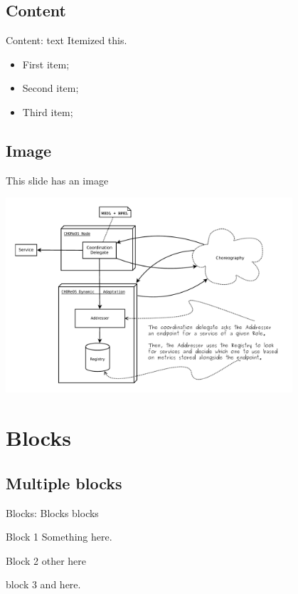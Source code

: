 \documentclass[slidestop,c]{beamer}
\begin{document}
\subsection{Content}
\begin{frame}[c]{Content: text}
    \justifying
      Itemized this. \\
     \begin{itemize}
      \item First item;
      \item Second item;
      \item Third item;
     \end{itemize}
\end{frame}

\subsection{Image}
\begin{frame}[c]{This slide has an image}
\begin{center}
      \includegraphics[width=0.8\textwidth]{figures/prototipe.pdf} \\
   \end{center}
\end{frame}

\section{Blocks}
\subsection{Multiple blocks}

\begin{frame}[c]{Blocks: Blocks blocks}
\begin{center}
    \begin{block}{Block 1}
        Something here.
    \end{block}
    \begin{block}{Block 2}
        other here
    \end{block}
    \begin{block}{block 3}
        and here.
    \end{block}
   \end{center}
\end{frame}
\end{document}
